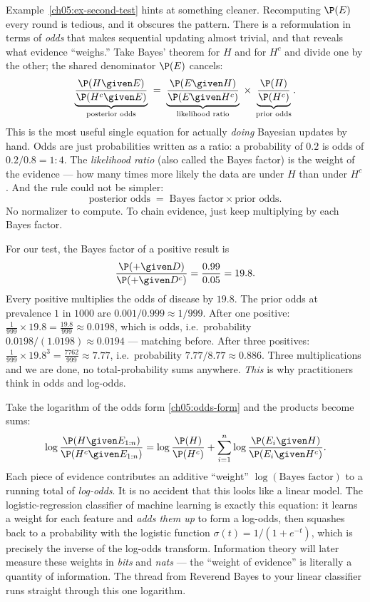 Example~\ref{ch05:ex-second-test} hints at something cleaner. Recomputing $\P(E)$ every
round is tedious, and it obscures the pattern. There is a reformulation in terms of
\emph{odds} that makes sequential updating almost trivial, and that reveals what evidence
``weighs.'' Take Bayes' theorem for $H$ and for $H^c$ and divide one by the other; the
shared denominator $\P(E)$ cancels:
\begin{equation}
  \underbrace{\frac{\P(H\given E)}{\P(H^c\given E)}}_{\text{posterior odds}}
  \;=\;
  \underbrace{\frac{\P(E\given H)}{\P(E\given H^c)}}_{\text{likelihood ratio}}
  \;\times\;
  \underbrace{\frac{\P(H)}{\P(H^c)}}_{\text{prior odds}}.
  \label{ch05:odds-form}
\end{equation}
This is the most useful single equation for actually \emph{doing} Bayesian updates by
hand. Odds are just probabilities written as a ratio: a probability of $0.2$ is odds of
$0.2/0.8 = 1{:}4$. The \emph{likelihood ratio} (also called the Bayes factor) is the
weight of the evidence --- how many times more likely the data are under $H$ than under
$H^c$. And the rule could not be simpler:
\[
  \text{posterior odds} \;=\; \text{Bayes factor} \times \text{prior odds}.
\]
No normalizer to compute. To chain evidence, just keep multiplying by each Bayes factor.

\begin{example}
For our test, the Bayes factor of a positive result is
\[
  \frac{\P(+\given D)}{\P(+\given D^c)} = \frac{0.99}{0.05} = 19.8.
\]
Every positive multiplies the odds of disease by $19.8$. The prior odds at prevalence
$1$ in $1000$ are $0.001/0.999 \approx 1/999$. After one positive:
$\frac{1}{999}\times 19.8 = \frac{19.8}{999} \approx 0.0198$, which is odds, i.e.\
probability $0.0198/(1.0198) \approx 0.0194$ --- matching before. After three positives:
$\frac{1}{999}\times 19.8^3 = \frac{7762}{999}\approx 7.77$, i.e.\ probability
$7.77/8.77 \approx 0.886$. Three multiplications and we are done, no total-probability
sums anywhere. \emph{This} is why practitioners think in odds and log-odds.
\end{example}

\begin{connectionbox}
Take the logarithm of the odds form \eqref{ch05:odds-form} and the products become sums:
\[
  \log\frac{\P(H\given E_{1:n})}{\P(H^c\given E_{1:n})}
  = \log\frac{\P(H)}{\P(H^c)} + \sum_{i=1}^{n}\log\frac{\P(E_i\given H)}{\P(E_i\given H^c)}.
\]
Each piece of evidence contributes an additive ``weight'' $\log(\text{Bayes factor})$ to
a running total of \emph{log-odds}. It is no accident that this looks like a linear model.
The logistic-regression classifier of machine learning is exactly this equation: it
learns a weight for each feature and \emph{adds them up} to form a log-odds, then squashes
back to a probability with the logistic function $\sigma(t) = 1/(1+e^{-t})$, which is
precisely the inverse of the log-odds transform. Information theory will later measure
these weights in \emph{bits} and \emph{nats} --- the ``weight of evidence'' is literally
a quantity of information. The thread from Reverend Bayes to your linear classifier runs
straight through this one logarithm.
\end{connectionbox}

